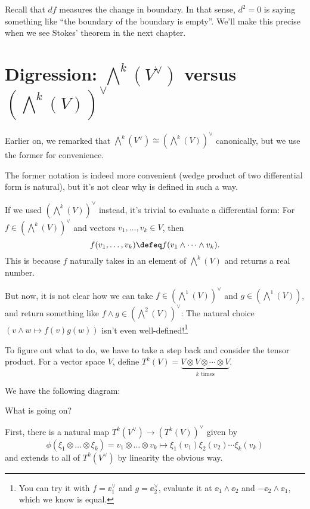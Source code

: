 Recall that $df$ measures the change in boundary.
In that sense, $d^2 = 0$ is saying something like
``the boundary of the boundary is empty''.
We'll make this precise when we see Stokes' theorem in the next chapter.

\section{Digression: $\bigwedge^k(V^\vee)$ versus $(\bigwedge^k(V))^\vee$}
\label{sec:wedge_product_dual}

Earlier on, we remarked that $\bigwedge^k(V^\vee) \cong (\bigwedge^k(V))^\vee$ canonically, but we
use the former for convenience.

The former notation is indeed more convenient (wedge product of
two differential form is natural), but it's not clear why  is
defined in such a way.

If we used $(\bigwedge^k(V))^\vee$ instead, it's trivial to evaluate a differential form:
For $f \in (\bigwedge^k(V))^\vee$ and vectors $v_1, \dots, v_k \in V$, then
\[
	f(v_1, \dots, v_k) \defeq f(v_1 \wedge \dots \wedge v_k).
\]
This is because $f$ naturally takes in an element of $\bigwedge^k(V)$ and returns a real number.

But now, it is not clear how we can take $f \in (\bigwedge^1(V))^\vee$ and $g \in (\bigwedge^1(V))$, and
return something like $f \wedge g \in (\bigwedge^2(V))^\vee$: The natural choice $(v \wedge w
\mapsto f(v) g(w))$ isn't even well-defined!\footnote{You can try it with $f = \ee_1^\vee$ and
$g = \ee_2^\vee$, evaluate it at $\ee_1 \wedge \ee_2$ and $-\ee_2 \wedge \ee_1$,
which we know is equal.}

To figure out what to do, we have to take a step back and consider the tensor product.
For a vector space $V$,
define $T^k(V) = \underbrace{V \otimes V \otimes \cdots \otimes V}_{\text{$k$ times}}$.

We have the following diagram:
\begin{center}
\end{center}

What is going on?

First, there is a natural map $T^k(V^\vee) \to (T^k(V))^\vee$ given by
\[ \phi(\xi_1 \otimes \dots \otimes \xi_k) = v_1 \otimes \dots \otimes v_k \mapsto
\xi_1(v_1) \xi_2(v_2) \dotsm \xi_k(v_k) \]
and extends to all of $T^k(V^\vee)$ by linearity the obvious way.

